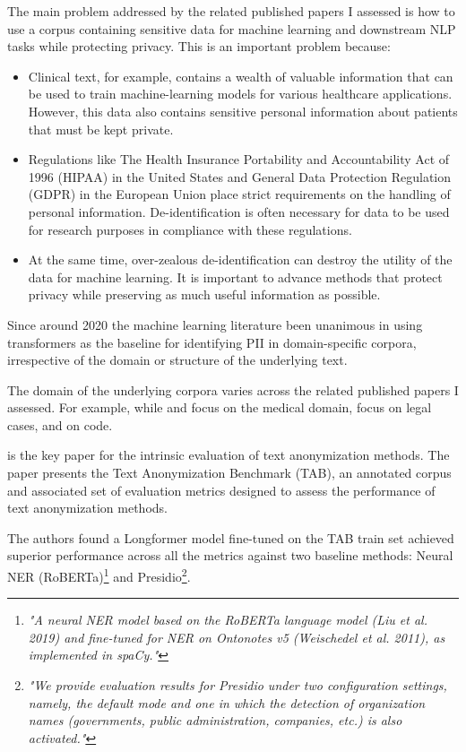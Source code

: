 \documentclass[11pt]{article}
\begin{document}
The main problem addressed by the related published papers I assessed is how to use a corpus containing sensitive data for machine learning and downstream NLP tasks while protecting privacy. This is an important problem because:

\begin{itemize}
\item Clinical text, for example, contains a wealth of valuable information that can be used to train machine-learning models for various healthcare applications. However, this data also contains sensitive personal information about patients that must be kept private.
\item Regulations like The Health Insurance Portability and Accountability Act of 1996 (HIPAA) in the United States and General Data Protection Regulation (GDPR) in the European Union place strict requirements on the handling of personal information. De-identification is often necessary for data to be used for research purposes in compliance with these regulations.
\item At the same time, over-zealous de-identification can destroy the utility of the data for machine learning. It is important to advance methods that protect privacy while preserving as much useful information as possible.
\end{itemize}

Since around 2020 the machine learning literature been unanimous in using transformers as the baseline for identifying PII in domain-specific corpora, irrespective of the domain or structure of the underlying text.

The domain of the underlying corpora varies across the related published papers I assessed. For example, while \citealt{hathurusinghe-etal-2021-privacy} and \citealt{vakili-etal-2022-downstream} focus on the medical domain, \citealt{pilan-etal-2022-text} focus on legal cases, and \citealt{vanderplas2022detecting} on code.

\citealt{pilan-etal-2022-text} is the key paper for the intrinsic evaluation of text anonymization methods. The paper presents the Text Anonymization Benchmark (TAB), an annotated corpus and associated set of evaluation metrics designed to assess the performance of text anonymization methods. 

The authors found a Longformer model fine-tuned on the TAB train set achieved superior performance across all the metrics against two baseline methods: Neural NER (RoBERTa)\footnote{\textit{"A neural NER model based on the RoBERTa language model (Liu et al. 2019) and fine-tuned for NER on Ontonotes v5 (Weischedel et al. 2011), as implemented in spaCy."}} and Presidio\footnote{\textit{"We provide evaluation results for Presidio under two configuration settings, namely, the default mode and one in which the detection of organization names (governments, public administration, companies, etc.) is also activated."}}.
\end{document}
